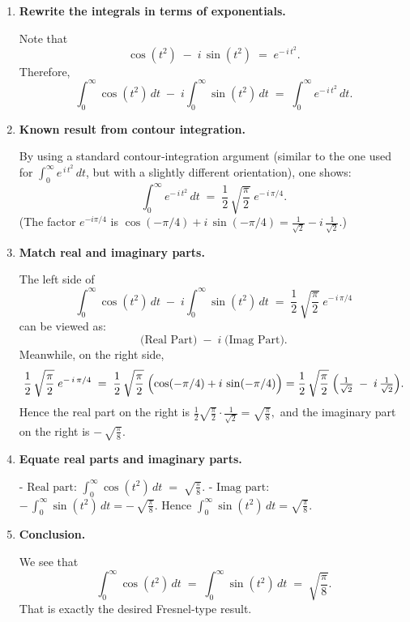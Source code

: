\documentclass[12pt]{article}
\theoremstyle{definition} %
\theoremstyle{plain} %
\begin{document}
\begin{enumerate}
\item \textbf{Rewrite the integrals in terms of exponentials.}

   Note that
   \[
   \cos(t^2) \;-\; i\,\sin(t^2)
   \;=\;
   e^{-\,i\,t^2}.
   \]
   Therefore,
   \[
   \int_{0}^{\infty}\cos(t^2)\,dt
   \;-\;
   i \int_{0}^{\infty}\sin(t^2)\,dt
   \;=\;
   \int_{0}^{\infty} e^{-\,i\,t^2}\,dt.
   \]

\item \textbf{Known result from contour integration.}

   By using a standard contour‐integration argument (similar to the one used for 
   \(\displaystyle \int_{0}^{\infty} e^{\,i\,t^2}\,dt\), 
   but with a slightly different orientation), one shows:
   \[
   \int_{0}^{\infty} e^{-\,i\,t^2}\,dt
   \;=\;
   \frac12 \,\sqrt{\frac{\pi}{2}}\;e^{-\,i\,\pi/4}.
   \]
   (The factor \(e^{-i\pi/4}\) is \(\cos(-\pi/4) + i\,\sin(-\pi/4) = \frac{1}{\sqrt{2}} - i\,\frac{1}{\sqrt{2}}\).)

\item \textbf{Match real and imaginary parts.}

   The left side of
   \[
   \int_{0}^{\infty}\cos(t^2)\,dt \;-\; i \int_{0}^{\infty}\sin(t^2)\,dt
   \;=\;
   \frac12 \,\sqrt{\frac{\pi}{2}}\;e^{-\,i\,\pi/4}
   \]
   can be viewed as:
   \[
   \bigl(\text{Real Part}\bigr)
   \;-\;
   i\;\bigl(\text{Imag Part}\bigr).
   \]
   Meanwhile, on the right side,
   \[
   \frac12 \,\sqrt{\frac{\pi}{2}}\;e^{-\,i\,\pi/4}
   \;=\;
   \frac12 \,\sqrt{\frac{\pi}{2}}\;
   \Bigl(\cos(-\pi/4) + i\,\sin(-\pi/4)\Bigr)
   =
   \frac12 \,\sqrt{\frac{\pi}{2}}\;
   \Bigl(\tfrac{1}{\sqrt{2}} \;-\; i\,\tfrac{1}{\sqrt{2}}\Bigr).
   \]
   Hence the real part on the right is 
   \(\displaystyle \frac12 \sqrt{\tfrac{\pi}{2}} \cdot \tfrac{1}{\sqrt{2}} = \sqrt{\tfrac{\pi}{8}},\)
   and the imaginary part on the right is
   \(-\,\sqrt{\tfrac{\pi}{8}}.\)

\item \textbf{Equate real parts and imaginary parts.}

   - \(\displaystyle \text{Real part:}\)
     \(\displaystyle \int_{0}^{\infty}\cos(t^2)\,dt \;=\;\sqrt{\tfrac{\pi}{8}}.\)
   - \(\displaystyle \text{Imag part:}\)
     \(-\,\int_{0}^{\infty}\sin(t^2)\,dt = -\,\sqrt{\tfrac{\pi}{8}}.\)
     Hence
     \(\displaystyle \int_{0}^{\infty}\sin(t^2)\,dt = \sqrt{\tfrac{\pi}{8}}.\)

\item \textbf{Conclusion.}

   We see that
   \[
   \int_{0}^{\infty}\cos(t^2)\,dt 
   \;=\;
   \int_{0}^{\infty}\sin(t^2)\,dt 
   \;=\;
   \sqrt{\frac{\pi}{8}}.
   \]
   That is exactly the desired Fresnel‐type result.

\end{enumerate}
\end{document}
